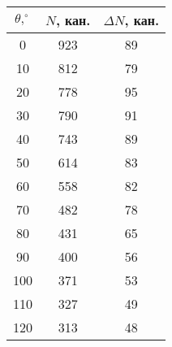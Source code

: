 \begin{tabular}{ccc}
\toprule
$\theta, ^\circ$ & $N$, кан. & $\Delta N$, кан. \\
\midrule
0 & 923 & 89 \\
10 & 812 & 79 \\
20 & 778 & 95 \\
30 & 790 & 91 \\
40 & 743 & 89 \\
50 & 614 & 83 \\
60 & 558 & 82 \\
70 & 482 & 78 \\
80 & 431 & 65 \\
90 & 400 & 56 \\
100 & 371 & 53 \\
110 & 327 & 49 \\
120 & 313 & 48 \\
\bottomrule
\end{tabular}

